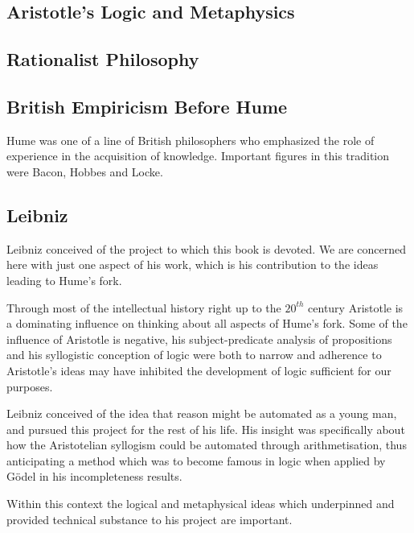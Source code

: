 

\subsection{Aristotle's Logic and Metaphysics}


\subsection{Rationalist Philosophy}

\subsection{British Empiricism Before Hume}

Hume was one of a line of British philosophers who emphasized the role of experience in the acquisition of knowledge.
Important figures in this tradition were Bacon, Hobbes and Locke.

\subsection{Leibniz}

Leibniz conceived of the project to which this book is devoted.
We are concerned here with just one aspect of his work, which is his contribution to the ideas leading to Hume's fork.

Through most of the intellectual history right up to the $20^{th}$ century Aristotle is a dominating influence on thinking about all aspects of Hume's fork.
Some of the influence of Aristotle is negative, his subject-predicate analysis of propositions and his syllogistic conception of logic were both to narrow and adherence to Aristotle's ideas may have inhibited the development of logic sufficient for our purposes.

Leibniz conceived of the idea that reason might be automated as a young man, and pursued this project for the rest of his life.
His insight was specifically about how the Aristotelian syllogism could be automated through arithmetisation, thus anticipating a method which was to become famous in logic when applied by G\"odel in his incompleteness results.

Within this context the logical and metaphysical ideas which underpinned and provided technical substance to his project are important.

